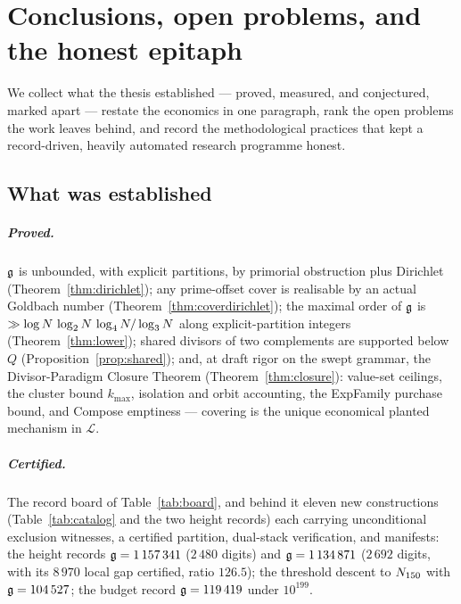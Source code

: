 \chapter{Conclusions, open problems, and the honest epitaph}
\label{ch:conclusions}

\begin{chapterabstract}
We collect what the thesis established --- proved, measured, and
conjectured, marked apart --- restate the economics in one paragraph,
rank the open problems the work leaves behind, and record the
methodological practices that kept a record-driven, heavily automated
research programme honest.
\end{chapterabstract}

\section{What was established}\label{sec:established}

\paragraph{Proved.} $\mathfrak{g}$ is unbounded, with explicit partitions, by
primorial obstruction plus Dirichlet (Theorem~\ref{thm:dirichlet});
any prime-offset cover is realisable by an actual Goldbach number
(Theorem~\ref{thm:coverdirichlet}); the maximal order of $\mathfrak{g}$ is
$\gg\log N\,\log_2N\,\log_4N/\log_3N$ along explicit-partition
integers (Theorem~\ref{thm:lower}); shared divisors of two complements
are supported below $Q$ (Proposition~\ref{prop:shared}); and, at draft
rigor on the swept grammar, the Divisor-Paradigm Closure Theorem
(Theorem~\ref{thm:closure}): value-set ceilings, the cluster bound
$k_{\max}$, isolation and orbit accounting, the ExpFamily purchase
bound, and Compose emptiness --- covering is the unique economical
planted mechanism in $\mathcal L$.

\paragraph{Certified.} The record board of Table~\ref{tab:board}, and
behind it eleven new constructions (Table~\ref{tab:catalog} and the two
height records) each carrying
unconditional exclusion witnesses, a certified partition, dual-stack
verification, and manifests: the height records $\mathfrak{g}=1\,157\,341$
($2\,480$ digits) and $\mathfrak{g}=1\,134\,871$ ($2\,692$ digits, with its
$8\,970$ local gap certified, ratio $126.5$); the threshold descent to
$N_{150}$ with $\mathfrak{g}=104\,527$; the budget record $\mathfrak{g}=119\,419$ under
$10^{199}$.

